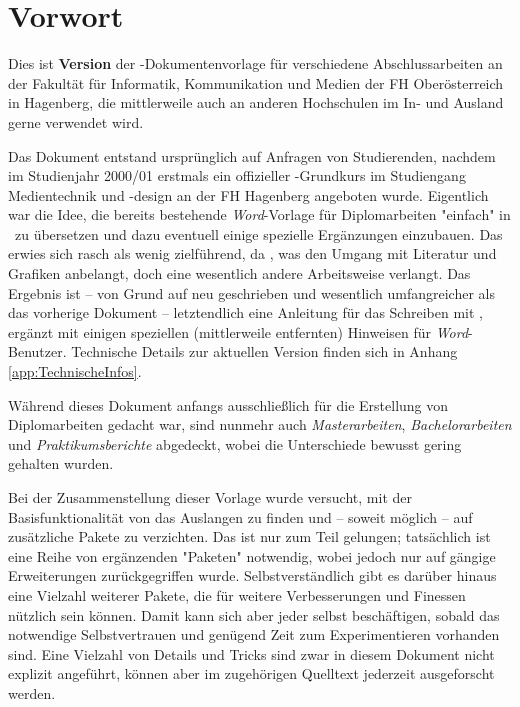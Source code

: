 \chapter{Vorwort} 	%


Dies ist \textbf{Version \hgbDate} der \latex-Dokumentenvorlage für 
verschiedene Abschlussarbeiten an der Fakultät für Informatik, Kommunikation
und Medien der FH Oberösterreich in Hagenberg, die mittlerweile auch 
an anderen Hochschulen im In- und Ausland gerne verwendet wird.

Das Dokument entstand ursprünglich auf Anfragen von Studierenden,
nachdem im Studienjahr 2000/01 erstmals ein offizieller
\latex-Grundkurs im Studiengang Medientechnik und -design an der
FH Hagenberg angeboten wurde. Eigentlich war die Idee, die bereits
bestehende \emph{Word}-Vorlage für Diplomarbeiten "einfach" in
\latex\ zu übersetzen und dazu eventuell einige spezielle
Ergänzungen einzubauen. Das erwies sich rasch als wenig
zielführend, da \latex, \va was den Umgang mit Literatur und
Grafiken anbelangt, doch eine wesentlich andere Arbeitsweise
verlangt. Das Ergebnis ist -- von Grund auf neu geschrieben und
wesentlich umfangreicher als das vorherige Dokument --
letztendlich eine Anleitung für das Schreiben mit \latex, ergänzt
mit einigen speziellen (mittlerweile entfernten) Hinweisen für \emph{Word}-Benutzer.
Technische Details zur aktuellen Version finden sich in Anhang \ref{app:TechnischeInfos}.

Während dieses Dokument anfangs ausschließlich für die Erstellung
von Diplomarbeiten gedacht war, sind nunmehr auch  
\emph{Masterarbeiten}, \emph{Bachelor\-arbeiten} und \emph{Praktikumsberichte} 
abgedeckt, wobei die Unterschiede bewusst gering gehalten wurden.

Bei der Zusammenstellung dieser Vorlage wurde versucht, mit der
Basisfunktionalität von \latex das Auslangen zu finden und -- soweit möglich --
auf zusätzliche Pakete zu verzichten. Das ist nur zum Teil gelungen;
tat\-säch\-lich ist eine Reihe von ergänzenden "Paketen" notwendig, wobei jedoch
nur auf gängige Erweiterungen zurückgegriffen wurde.
Selbstverständlich gibt es darüber hinaus eine Vielzahl weiterer Pakete,
die für weitere Verbesserungen und Finessen nützlich sein können. Damit kann
sich aber jeder selbst beschäftigen, sobald das notwendige Selbstvertrauen und
genügend Zeit zum Experimentieren vorhanden sind.
Eine Vielzahl von Details und Tricks sind zwar in diesem Dokument nicht explizit
angeführt, können aber im zugehörigen Quelltext jederzeit ausgeforscht
werden.

